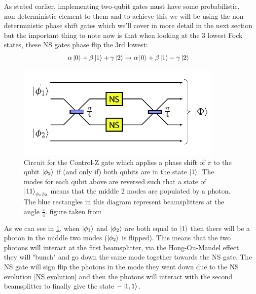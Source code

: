 As stated earlier, implementing two-qubit gates must have some probabilistic, non-deterministic element to them and to achieve this we will be using the non-deterministic phase shift gates which we'll cover in more detail in the next section but the important thing to note now is that when looking at the 3 lowest Fock states, these NS gates phase flip the 3rd lowest:
\begin{equation} \label{NS evolution}
    \alpha\ket{0} + \beta\ket{1} + \gamma\ket{2} \rightarrow \alpha\ket{0} + \beta\ket{1} - \gamma\ket{2}
\end{equation} \cite{Kok:2005jip}

\begin{figure}[h]
    \centering
    \includegraphics[width=0.9\textwidth]{images/CZ-gate.png}
    \caption{Circuit for the Control-Z gate which applies a phase shift of $\pi$ to the qubit $\ket{\phi_2}$ if (and only if) both qubits are in the state $\ket{1}$. The modes for each qubit above are reversed such that a state of $\ket{11}_{\phi_1\phi_2}$ means that the middle 2 modes are populated by a photon. The blue rectangles in this diagram represent beamsplitters at the angle $\frac{\pi}{4}$. figure taken from \cite{Kok:2005jip}}\label{fig:CZ_gate}
\end{figure}

As we can see in \cref{fig:CZ_gate}, when $\ket{\phi_1}$ and $\ket{\phi_2}$ are both equal to $\ket{1}$ then there will be a photon in the middle two modes ($\ket{\phi_2}$ is flipped). This means that the two photons will interact at the first beamsplitter, via the Hong-Ou-Mandel effect they will "bunch" and go down the same mode together towards the NS gate. The NS gate will sign flip the photons in the mode they went down due to the NS evolution \cref{NS evolution} and then the photons will interact with the second beamsplitter to finally give the state $-\ket{1,1}$.%

